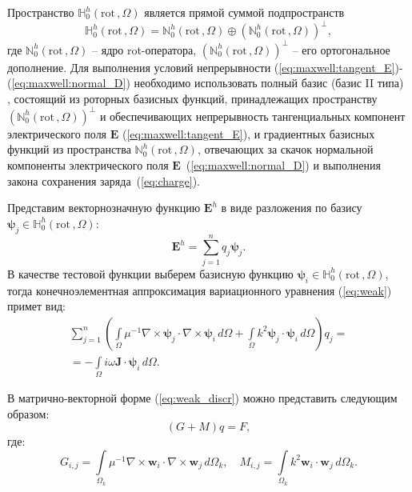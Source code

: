 \documentclass[a4paper,14pt]{article}
\begin{document}
Пространство $\mathbb{H}_{0}^h( \mathrm{rot}\,, \Omega )$ является прямой суммой подпространств~\citep{hiptmair}
\begin{equation*}
	\mathbb{H}_{0}^h( \mathrm{rot}\,, \Omega ) = \mathbb{N}_{0}^h( \mathrm{rot}\,, \Omega ) \oplus (\mathbb{N}_{0}^h( \mathrm{rot}\,, \Omega ))^{\bot} ,
\end{equation*}
где $\mathbb{N}_{0}^h( \mathrm{rot}\,, \Omega )$ -- ядро rot-оператора, $(\mathbb{N}_{0}^h( \mathrm{rot}\,, \Omega ))^{\bot}$ -- его ортогональное дополнение. Для выполнения условий непрерывности (\ref{eq:maxwell:tangent_E})-(\ref{eq:maxwell:normal_D}) необходимо использовать полный базис (базис II типа) \citep{webb1993,webb1999,nedelec1980,nedelec1986}, состоящий из роторных базисных функций, принадлежащих пространству $(\mathbb{N}_{0}^h( \mathrm{rot}\,, \Omega ))^{\bot}$ и обеспечивающих непрерывность тангенциальных компонент электрического поля $\mathbf{E}$ (\ref{eq:maxwell:tangent_E}), и градиентных базисных функций из пространства $\mathbb{N}_{0}^h( \mathrm{rot}\,, \Omega )$, отвечающих за скачок нормальной компоненты электрического поля $\mathbf{E}$~(\ref{eq:maxwell:normal_D}) и выполнения закона сохранения заряда~(\ref{eq:charge}).

Представим векторнозначную функцию $\mathbf{E}^h$ в виде разложения по базису \linebreak $\boldsymbol{\psi}_j \in \mathbb{H}_{0}^h( \mathrm{rot}\,, \Omega )$:
\begin{equation*}
	\mathbf{E}^h = \sum\limits_{j = 1}^n q_j \boldsymbol{\psi}_j .
\end{equation*}
В качестве тестовой функции выберем базисную функцию $\boldsymbol{\psi}_i \in \mathbb{H}_{0}^h( \mathrm{rot}\,, \Omega )$, тогда конечноэлементная аппроксимация вариационного уравнения (\ref{eq:weak}) примет вид:
\begin{equation}
	\begin{array}{c} { \displaystyle
		\sum\limits_{j = 1}^n \left( \int\limits_\Omega \mu^{-1} \nabla \times \boldsymbol{\psi}_j \cdot \nabla \times \boldsymbol{\psi}_i \,d\Omega + \int\limits_\Omega k^{2} \boldsymbol{\psi}_j \cdot \boldsymbol{\psi}_i \,d\Omega \right) q_j =
	} \\ { \displaystyle
		=  - \int\limits_\Omega i \omega \mathbf{J} \cdot \boldsymbol{\psi}_i \,d\Omega .
	} \end{array}
	\label{eq:weak_discr}
\end{equation}

В матрично-векторной форме (\ref{eq:weak_discr}) можно представить следующим образом:
\begin{equation}
	( G + M )q = F , \label{eq:form_29}
\end{equation}
где:
\begin{equation*}
	G_{ i,j } = \int\limits_{\Omega_k} \mu^{-1} \nabla \times \mathbf{w}_i \cdot \nabla \times \mathbf{w}_j \,d\Omega_k , \text{~~~}
	M_{ i,j } = \int\limits_{\Omega_k} k^2 \mathbf{w}_i \cdot \mathbf{w}_j \,d\Omega_k . \label{eq:local_matrixes}
\end{equation*}
\end{document}
